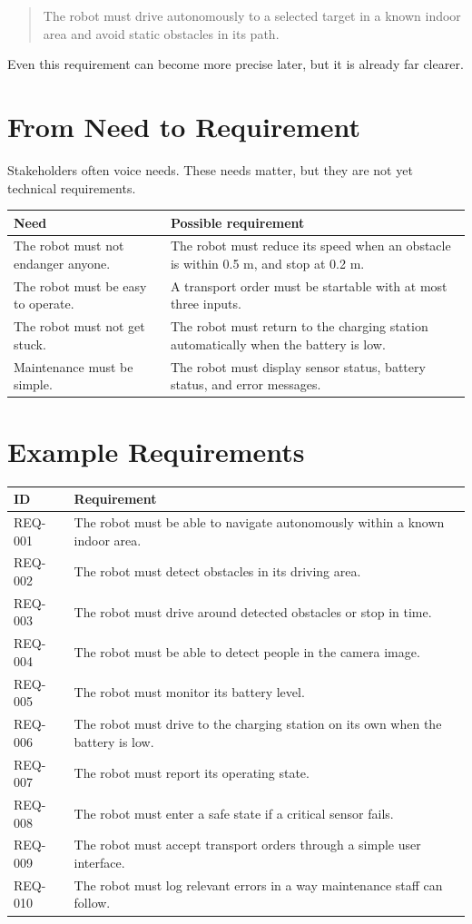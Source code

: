 \begin{quote}
The robot must drive autonomously to a selected target in a known indoor area and avoid static obstacles in its path.
\end{quote}

Even this requirement can become more precise later, but it is already far clearer.

\section{From Need to Requirement}
Stakeholders often voice needs. These needs matter, but they are not yet technical requirements.

\begin{center}
\begin{tabular}{p{}p{}}
\toprule
\textbf{Need} & \textbf{Possible requirement} \\
\midrule
The robot must not endanger anyone. & The robot must reduce its speed when an obstacle is within 0.5 m, and stop at 0.2 m. \\
The robot must be easy to operate. & A transport order must be startable with at most three inputs. \\
The robot must not get stuck. & The robot must return to the charging station automatically when the battery is low. \\
Maintenance must be simple. & The robot must display sensor status, battery status, and error messages. \\
\bottomrule
\end{tabular}
\end{center}

\section{Example Requirements}
\begin{longtable}{p{}p{}}
\toprule
ID & Requirement\\
\midrule
REQ-001 & The robot must be able to navigate autonomously within a known indoor area.\\
REQ-002 & The robot must detect obstacles in its driving area.\\
REQ-003 & The robot must drive around detected obstacles or stop in time.\\
REQ-004 & The robot must be able to detect people in the camera image.\\
REQ-005 & The robot must monitor its battery level.\\
REQ-006 & The robot must drive to the charging station on its own when the battery is low.\\
REQ-007 & The robot must report its operating state.\\
REQ-008 & The robot must enter a safe state if a critical sensor fails.\\
REQ-009 & The robot must accept transport orders through a simple user interface.\\
REQ-010 & The robot must log relevant errors in a way maintenance staff can follow.\\
\bottomrule
\end{longtable}

